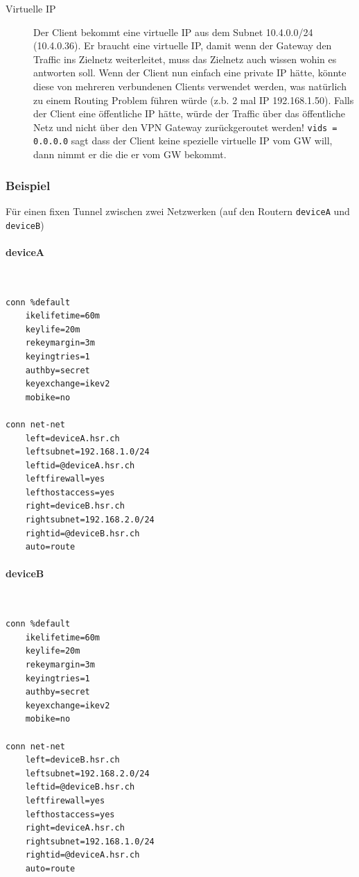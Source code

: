 \begin{description}
    \item[Virtuelle IP] Der Client bekommt eine virtuelle IP aus dem Subnet 10.4.0.0/24 (10.4.0.36). Er braucht eine virtuelle IP, damit wenn der Gateway den Traffic ins Zielnetz weiterleitet, muss das Zielnetz auch wissen wohin es antworten soll. Wenn der Client nun einfach eine private IP hätte, könnte diese von mehreren verbundenen Clients verwendet werden, was natürlich zu einem Routing Problem führen würde (z.b. 2 mal IP 192.168.1.50). Falls der Client eine öffentliche IP hätte, würde der Traffic über das öffentliche Netz und nicht über den VPN Gateway zurückgeroutet werden! \lstinline|vids = 0.0.0.0| sagt dass der Client keine spezielle virtuelle IP vom GW will, dann nimmt er die die er vom GW bekommt.
\end{description}


\subsubsection{Beispiel}
Für einen fixen Tunnel zwischen zwei Netzwerken (auf den Routern \lstinline|deviceA| und \lstinline|deviceB|)

\paragraph{deviceA} \hfill \\
\begin{lstlisting}
conn %default
	ikelifetime=60m
	keylife=20m
	rekeymargin=3m
	keyingtries=1
	authby=secret
	keyexchange=ikev2
	mobike=no

conn net-net
	left=deviceA.hsr.ch
	leftsubnet=192.168.1.0/24
	leftid=@deviceA.hsr.ch
	leftfirewall=yes
	lefthostaccess=yes
	right=deviceB.hsr.ch
	rightsubnet=192.168.2.0/24
	rightid=@deviceB.hsr.ch
	auto=route
\end{lstlisting}

\paragraph{deviceB} \hfill \\
\begin{lstlisting}
conn %default
	ikelifetime=60m
	keylife=20m
	rekeymargin=3m
	keyingtries=1
	authby=secret
	keyexchange=ikev2
	mobike=no

conn net-net
	left=deviceB.hsr.ch
	leftsubnet=192.168.2.0/24
	leftid=@deviceB.hsr.ch
	leftfirewall=yes
	lefthostaccess=yes
	right=deviceA.hsr.ch
	rightsubnet=192.168.1.0/24
	rightid=@deviceA.hsr.ch
	auto=route
\end{lstlisting}


